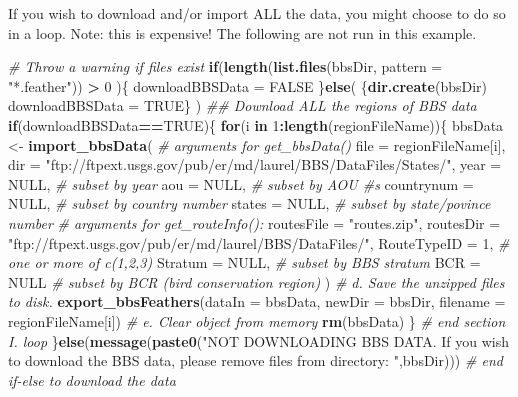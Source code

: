 \documentclass[12pt,twoside,openany]{reedthesis}
\newenvironment{Shaded}{\begin{snugshade}}{\end{snugshade}}
\newcommand{\CommentTok}[1]{\textcolor[rgb]{0.56,0.35,0.01}{\textit{#1}}}
\newcommand{\ControlFlowTok}[1]{\textcolor[rgb]{0.13,0.29,0.53}{\textbf{#1}}}
\newcommand{\DataTypeTok}[1]{\textcolor[rgb]{0.13,0.29,0.53}{#1}}
\newcommand{\DecValTok}[1]{\textcolor[rgb]{0.00,0.00,0.81}{#1}}
\newcommand{\KeywordTok}[1]{\textcolor[rgb]{0.13,0.29,0.53}{\textbf{#1}}}
\newcommand{\NormalTok}[1]{#1}
\newcommand{\OperatorTok}[1]{\textcolor[rgb]{0.81,0.36,0.00}{\textbf{#1}}}
\newcommand{\OtherTok}[1]{\textcolor[rgb]{0.56,0.35,0.01}{#1}}
\newcommand{\StringTok}[1]{\textcolor[rgb]{0.31,0.60,0.02}{#1}}
\begin{document}
If you wish to download and/or import ALL the data, you might choose to do so in a loop. Note: this is expensive! The following are not run in this example.
\begin{Shaded}
\begin{Highlighting}[]
\CommentTok{# Throw a warning if files exist}
    \ControlFlowTok{if}\NormalTok{(}\KeywordTok{length}\NormalTok{(}\KeywordTok{list.files}\NormalTok{(bbsDir, }\DataTypeTok{pattern =} \StringTok{"*.feather"}\NormalTok{)) }\OperatorTok{>}\StringTok{ }\DecValTok{0}\NormalTok{ )\{}
\NormalTok{        downloadBBSData =}\StringTok{ }\OtherTok{FALSE}
\NormalTok{    \}}\ControlFlowTok{else}\NormalTok{(}
\NormalTok{        \{}\KeywordTok{dir.create}\NormalTok{(bbsDir)}
\NormalTok{        downloadBBSData =}\StringTok{ }\OtherTok{TRUE}\NormalTok{\}}
\NormalTok{        )}
\CommentTok{## Download ALL the regions of BBS data}
\ControlFlowTok{if}\NormalTok{(downloadBBSData}\OperatorTok{==}\OtherTok{TRUE}\NormalTok{)\{}
\ControlFlowTok{for}\NormalTok{(i }\ControlFlowTok{in} \DecValTok{1}\OperatorTok{:}\KeywordTok{length}\NormalTok{(regionFileName))\{}
\NormalTok{        bbsData <-}\StringTok{  }\KeywordTok{import_bbsData}\NormalTok{(}
            \CommentTok{# arguments for get_bbsData()}
            \DataTypeTok{file =}\NormalTok{ regionFileName[i],}
            \DataTypeTok{dir =}  \StringTok{"ftp://ftpext.usgs.gov/pub/er/md/laurel/BBS/DataFiles/States/"}\NormalTok{,}
            \DataTypeTok{year =} \OtherTok{NULL}\NormalTok{, }\CommentTok{# subset by year}
            \DataTypeTok{aou =} \OtherTok{NULL}\NormalTok{, }\CommentTok{# subset by AOU #s}
            \DataTypeTok{countrynum =} \OtherTok{NULL}\NormalTok{, }\CommentTok{# subset by country number}
            \DataTypeTok{states =} \OtherTok{NULL}\NormalTok{, }\CommentTok{# subset by state/povince number}
            \CommentTok{#  arguments for get_routeInfo():}
            \DataTypeTok{routesFile =} \StringTok{"routes.zip"}\NormalTok{,}
            \DataTypeTok{routesDir =}  \StringTok{"ftp://ftpext.usgs.gov/pub/er/md/laurel/BBS/DataFiles/"}\NormalTok{,}
            \DataTypeTok{RouteTypeID =} \DecValTok{1}\NormalTok{,}
            \CommentTok{# one or more of c(1,2,3)}
            \DataTypeTok{Stratum =} \OtherTok{NULL}\NormalTok{,  }\CommentTok{# subset by BBS stratum}
            \DataTypeTok{BCR =} \OtherTok{NULL} \CommentTok{# subset by BCR (bird conservation region)}
\NormalTok{        )}
\CommentTok{# d. Save the unzipped files to disk.}
\KeywordTok{export_bbsFeathers}\NormalTok{(}\DataTypeTok{dataIn  =}\NormalTok{ bbsData,}
                \DataTypeTok{newDir  =}\NormalTok{ bbsDir,}
                \DataTypeTok{filename =}\NormalTok{ regionFileName[i])}
\CommentTok{# e. Clear object from memory}
\KeywordTok{rm}\NormalTok{(bbsData)}
\NormalTok{\} }\CommentTok{# end section I. loop}
\NormalTok{\}}\ControlFlowTok{else}\NormalTok{(}\KeywordTok{message}\NormalTok{(}\KeywordTok{paste0}\NormalTok{(}\StringTok{"NOT DOWNLOADING BBS DATA. If you wish to download the BBS data, please remove files from directory: "}\NormalTok{,bbsDir))) }\CommentTok{# end if-else to download the data}
\end{Highlighting}
\end{Shaded}
\end{document}
